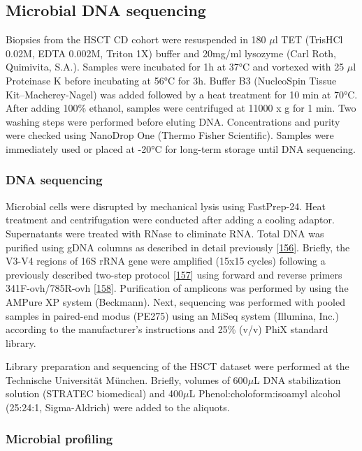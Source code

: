 \documentclass[
  12pt,
  a4paper,
  twoside,
  openright]{book}
\begin{document}
\hypertarget{microbial-dna-sequencing}{%
\subsection{Microbial DNA sequencing}\label{microbial-dna-sequencing}}

Biopsies from the HSCT CD cohort were resuspended in 180 \(\mu\)l TET (TrisHCl 0.02M, EDTA 0.002M, Triton 1X) buffer and 20mg/ml lysozyme (Carl Roth, Quimivita, S.A.). Samples were incubated for 1h at 37°C and vortexed with 25 \(\mu\)l Proteinase K before incubating at 56°C for 3h.
Buffer B3 (NucleoSpin Tissue Kit--Macherey-Nagel) was added followed by a heat treatment for 10 min at 70°C.
After adding 100\% ethanol, samples were centrifuged at 11000 x g for 1 min.
Two washing steps were performed before eluting DNA.
Concentrations and purity were checked using NanoDrop One (Thermo Fisher Scientific).
Samples were immediately used or placed at -20°C for long-term storage until DNA sequencing.

\hypertarget{dna-sequencing}{%
\subsubsection{DNA sequencing}\label{dna-sequencing}}

Microbial cells were disrupted by mechanical lysis using FastPrep-24.
Heat treatment and centrifugation were conducted after adding a cooling adaptor.
Supernatants were treated with RNase to eliminate RNA.
Total DNA was purified using gDNA columns as described in detail previously {[}\protect\hyperlink{ref-berry2011}{156}{]}.
Briefly, the V3-V4 regions of 16S rRNA gene were amplified (15x15 cycles) following a previously described two-step protocol {[}\protect\hyperlink{ref-klindworth2013}{157}{]} using forward and reverse primers 341F-ovh/785R-ovh {[}\protect\hyperlink{ref-edgar2013}{158}{]}.
Purification of amplicons was performed by using the AMPure XP system (Beckmann).
Next, sequencing was performed with pooled samples in paired-end modus (PE275) using an MiSeq system (Illumina, Inc.) according to the manufacturer's instructions and 25\% (v/v) PhiX standard library.

Library preparation and sequencing of the HSCT dataset were performed at the Technische Universität München.
Briefly, volumes of 600\(\mu\)L DNA stabilization solution (STRATEC biomedical) and 400\(\mu\)L Phenol:choloform:isoamyl alcohol (25:24:1, Sigma-Aldrich) were added to the aliquots.

\hypertarget{microbial-profiling}{%
\subsubsection{Microbial profiling}\label{microbial-profiling}}
\end{document}
